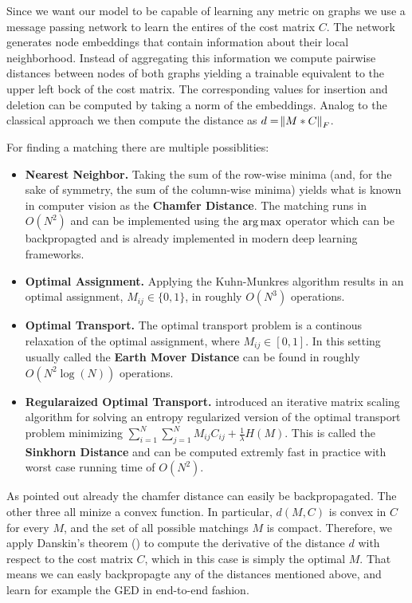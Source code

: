 Since we want our model to be capable of learning any metric on graphs we use a message passing network to learn the entires of the cost matrix $C$. The network generates node embeddings that contain information about their local neighborhood. Instead of aggregating this information we compute pairwise distances between nodes of both graphs yielding a trainable equivalent to the upper left bock of the cost matrix. The corresponding values for insertion and deletion can be computed by taking a norm of the embeddings. Analog to the classical approach we then compute the distance as $ d = \norm{M * C}_F $.

For finding a matching there are multiple possiblities:
\begin{itemize}
     \item \textbf{Nearest Neighbor.} Taking the sum of the row-wise minima (and, for the sake of symmetry, the sum of the column-wise minima) yields what is known in computer vision as the \textbf{Chamfer Distance}. The matching runs in $O(N^2)$ and can be implemented using the $\operatorname*{arg\,max}$ operator which can be backpropagted and is already implemented in modern deep learning frameworks.
     \item \textbf{Optimal Assignment.} Applying the Kuhn-Munkres algorithm results in an optimal assignment, $M_{ij} \in \{0,1\}$, in roughly $O(N^3)$ operations.
     \item \textbf{Optimal Transport.} The optimal transport problem is a continous relaxation of the optimal assignment, where $M_{ij} \in \left[ 0,1 \right]$. In this setting usually called the \textbf{Earth Mover Distance} can be found in roughly $O(N^2 \log(N))$ operations.
     \item \textbf{Regularaized Optimal Transport.} \cite{sinkhorn2013} introduced an iterative matrix scaling algorithm for solving an entropy regularized version of the optimal transport problem minimizing $\sum_{i = 1}^{N} \sum_{j = 1}^{N} M_{ij} C_{ij} + \frac{1}{\lambda} H(M)$. This is called the \textbf{Sinkhorn Distance} and can be computed extremly fast in practice with worst case running time of $O(N^2)$.
\end{itemize}
As pointed out already the chamfer distance can easily be backpropagated. The other three all minize a convex function. In particular, $d(M,C)$ is convex in $C$ for every $M$, and the set of all possible matchings $M$ is compact. Therefore, we apply Danskin's theorem (\citealp{danskin1967}) to compute the derivative of the distance $d$ with respect to the cost matrix $C$, which in this case is simply the optimal $M$. That means we can easly backpropagte any of the distances mentioned above, and learn for example the GED in end-to-end fashion.

